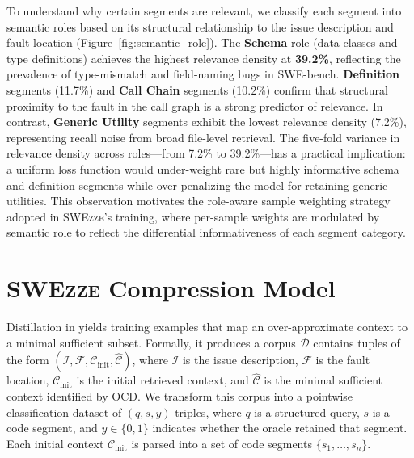 \documentclass[sigconf,nonacm]{acmart}
\newcommand{\projName}{\textsc{SWEzze}\xspace}
\begin{document}
To understand why certain segments are relevant, we classify each segment into semantic roles based on its structural relationship to the issue description and fault location (Figure~\ref{fig:semantic_role}). The \textbf{Schema} role (data classes and type definitions) achieves the highest relevance density at \textbf{39.2\%}, reflecting the prevalence of type-mismatch and field-naming bugs in SWE-bench. \textbf{Definition} segments (11.7\%) and \textbf{Call Chain} segments (10.2\%) confirm that structural proximity to the fault in the call graph is a strong predictor of relevance. In contrast, \textbf{Generic Utility} segments exhibit the lowest relevance density (7.2\%), representing recall noise from broad file-level retrieval. The five-fold variance in relevance density across roles---from 7.2\% to 39.2\%---has a practical implication: a uniform loss function would under-weight rare but highly informative schema and definition segments while over-penalizing the model for retaining generic utilities. This observation motivates the role-aware sample weighting strategy adopted in \projName's training, where per-sample weights are modulated by semantic role to reflect the differential informativeness of each segment category.

\section{\projName Compression Model}
\label{sec:swezze}

Distillation in  yields training examples that map an over-approximate context to a minimal sufficient subset. Formally, it produces a corpus $\mathcal{D}$ contains tuples of the form $(\mathcal{I}, \mathcal{F}, \mathcal{C}_\mathrm{init}, \hat{\mathcal{C}})$, where $\mathcal{I}$ is the issue description, $\mathcal{F}$ is the fault location, $\mathcal{C}_\mathrm{init}$ is the initial retrieved context, and $\hat{\mathcal{C}}$ is the minimal sufficient context identified by OCD. We transform this corpus into a pointwise classification dataset of $(q, s, y)$ triples, where $q$ is a structured query, $s$ is a code segment, and $y \in \{0, 1\}$ indicates whether the oracle retained that segment. Each initial context $\mathcal{C}_\mathrm{init}$ is parsed into a set of code segments $\{s_1, \ldots, s_n\}$.
\end{document}
